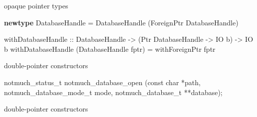 \documentclass[ignorenonframetext,aspectratio=169]{beamer}
\newenvironment{Shaded}{}{}
\newcommand{\KeywordTok}[1]{\textcolor[rgb]{0.00,0.44,0.13}{\textbf{{#1}}}}
\newcommand{\DataTypeTok}[1]{\textcolor[rgb]{0.56,0.13,0.00}{{#1}}}
\newcommand{\DecValTok}[1]{\textcolor[rgb]{0.25,0.63,0.44}{{#1}}}
\newcommand{\StringTok}[1]{\textcolor[rgb]{0.25,0.44,0.63}{{#1}}}
\newcommand{\OtherTok}[1]{\textcolor[rgb]{0.00,0.44,0.13}{{#1}}}
\newcommand{\FunctionTok}[1]{\textcolor[rgb]{0.02,0.16,0.49}{{#1}}}
\newcommand{\NormalTok}[1]{{#1}}
\newcommand\greyuline{\bgroup\markoverwith
    {\textcolor{lightgray}{\rule[-0.5ex]{2pt}{0.4pt}}}\ULon}
\begin{document}
\begin{frame}[fragile]{opaque pointer types}

\begin{Shaded}
\begin{Highlighting}[]
\KeywordTok{newtype} \DataTypeTok{DatabaseHandle} \FunctionTok{=} \DataTypeTok{DatabaseHandle} \NormalTok{(}\DataTypeTok{ForeignPtr} \DataTypeTok{DatabaseHandle}\NormalTok{)}

\NormalTok{withDatabaseHandle}
\OtherTok{  ::} \DataTypeTok{DatabaseHandle} \OtherTok{->} \NormalTok{(}\DataTypeTok{Ptr} \DataTypeTok{DatabaseHandle} \OtherTok{->} \DataTypeTok{IO} \NormalTok{b) }\OtherTok{->} \DataTypeTok{IO} \NormalTok{b}
\NormalTok{withDatabaseHandle (}\DataTypeTok{DatabaseHandle} \NormalTok{fptr) }\FunctionTok{=}
  \NormalTok{withForeignPtr fptr}
\end{Highlighting}
\end{Shaded}

\end{frame}

\begin{frame}[fragile]{double-pointer constructors}

\begin{Shaded}
\begin{Highlighting}[]
\NormalTok{notmuch_status_t}
\NormalTok{notmuch_database_open (}\DataTypeTok{const} \DataTypeTok{char} \NormalTok{*path,}
                       \NormalTok{notmuch_database_mode_t mode,}
                       \NormalTok{notmuch_database_t **database);}
\end{Highlighting}
\end{Shaded}

\end{frame}

\begin{frame}[fragile]{double-pointer constructors}

\begin{Shaded}
\end{Shaded}

\end{frame}
\end{document}
